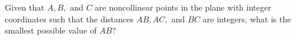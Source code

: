 Given that $A,B,$ and $C$ are noncollinear points in the plane with integer coordinates such that the distances $AB,AC,$ and $BC$ are integers, what is the smallest possible value of $AB?$
